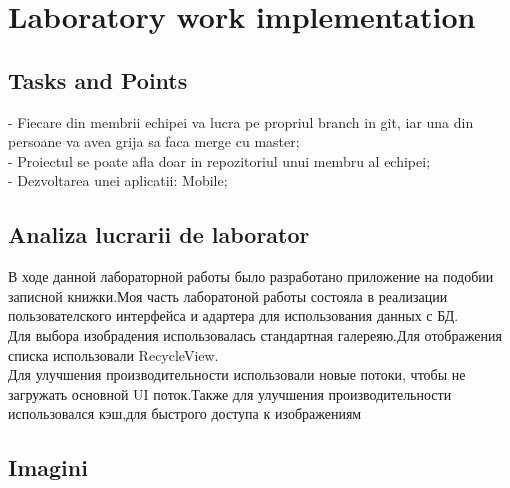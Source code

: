 \section{Laboratory work implementation}

\subsection{Tasks and Points}

- Fiecare din membrii echipei va lucra pe propriul branch in git, iar una din persoane va avea grija sa faca merge cu master; \\
\indent 
- Proiectul se poate afla doar in repozitoriul unui membru al echipei; \\
\indent 
- Dezvoltarea unei aplicatii: Mobile;

\subsection{Analiza lucrarii de laborator}
В ходе данной лабораторной работы было разработано приложение на подобии записной книжки.Моя часть лаборатоной работы состояла в реализации пользователского интерфейса и адартера для использования данных с БД.\\
\indent
Для выбора изобрадения использовалась стандартная галереяю.Для отображения списка использовали RecycleView. \\
\indent
Для улучшения производительности использовали новые потоки, чтобы не загружать основной UI поток.Также для улучшения производительности использовался кэш,для быстрого доступа к изображениям  




\subsection{Imagini}

